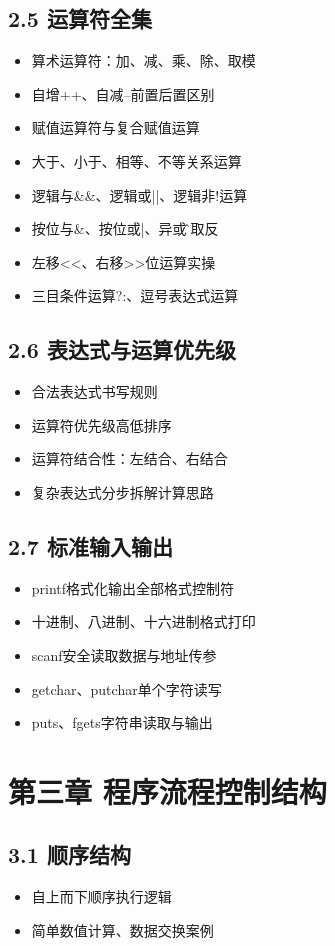 \subsection*{2.5 运算符全集}
\begin{itemize}
\item 算术运算符：加、减、乘、除、取模
\item 自增++、自减--前置后置区别
\item 赋值运算符与复合赋值运算
\item 大于、小于、相等、不等关系运算
\item 逻辑与\&\&、逻辑或||、逻辑非!运算
\item 按位与\&、按位或|、异或\^、取反~
\item 左移<<、右移>>位运算实操
\item 三目条件运算?:、逗号表达式运算
\end{itemize}

\subsection*{2.6 表达式与运算优先级}
\begin{itemize}
\item 合法表达式书写规则
\item 运算符优先级高低排序
\item 运算符结合性：左结合、右结合
\item 复杂表达式分步拆解计算思路
\end{itemize}

\subsection*{2.7 标准输入输出}
\begin{itemize}
\item printf格式化输出全部格式控制符
\item 十进制、八进制、十六进制格式打印
\item scanf安全读取数据与地址传参
\item getchar、putchar单个字符读写
\item puts、fgets字符串读取与输出
\end{itemize}

\section*{第三章 程序流程控制结构}
\subsection*{3.1 顺序结构}
\begin{itemize}
\item 自上而下顺序执行逻辑
\item 简单数值计算、数据交换案例
\end{itemize}

